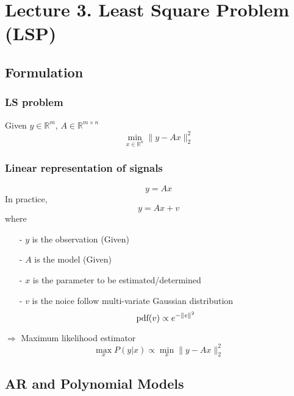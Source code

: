 \section{Lecture 3. Least Square Problem (LSP)}
\begin{multicols}{2}
\subsection{Formulation}
\subsubsection{LS problem}
Given $y\in\mathbb{R}^m$, $A\in\mathbb{R}^{m\times n}$
\[
    \min_{x\in\mathbb{R}^n} \|y-Ax\|_2^2
\]
\subsubsection{Linear representation of signals}
\[
    y=Ax
\]
In practice,
\[
    y=Ax+v
\]
where 
\begin{itemize}
    \item [-] $y$ is the observation (Given)
    \item [-] $A$ is the model (Given)
    \item [-] $x$ is the parameter to be estimated/determined
    \item [-] $v$ is the noice follow multi-variate Gaussian distribution
    \[
        \text{\rm pdf}(v)\propto e^{-\|v\|^2}
    \]
\end{itemize}
$\Longrightarrow$ Maximum likelihood estimator 
\[
    \max_x P(y|x) \propto \min_x \|y-Ax\|_2^2
\]
\subsection{AR and Polynomial Models}

\end{multicols}
